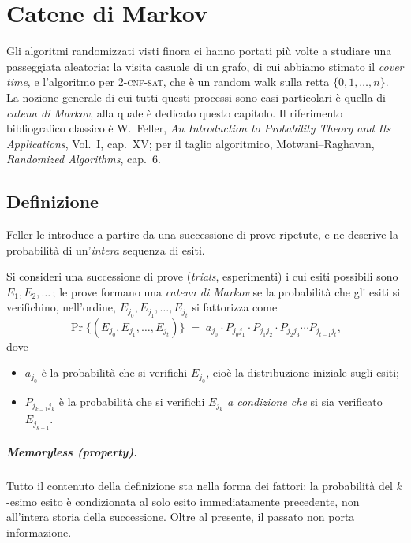\chapter{Catene di Markov}
\label{cap:catene-markov}

Gli algoritmi randomizzati visti finora ci hanno portati più volte a studiare una
passeggiata aleatoria: la visita casuale di un grafo, di cui abbiamo stimato il
\emph{cover time}, e l'algoritmo per \textsc{2-cnf-sat}, che è un random walk sulla
retta $\{0,1,\dots,n\}$. La nozione generale di cui tutti questi processi sono casi
particolari è quella di \emph{catena di Markov}, alla quale è dedicato questo
capitolo. Il riferimento bibliografico classico è W.~Feller, \emph{An Introduction to
Probability Theory and Its Applications}, Vol.~I, cap.~XV; per il taglio algoritmico,
Motwani--Raghavan, \emph{Randomized Algorithms}, cap.~6.


\section{Definizione}

Feller le introduce a partire da una successione di prove ripetute, e ne descrive la
probabilità di un'\emph{intera} sequenza di esiti.

\begin{definizione}\label{def:mc-feller}
  Si consideri una successione di prove (\emph{trials}, esperimenti) i cui esiti
  possibili sono $E_1, E_2, \dots$\,; le prove formano una \emph{catena di Markov} se la
  probabilità che gli esiti si verifichino, nell'ordine, $E_{j_0}, E_{j_1}, \dots,
  E_{j_t}$ si fattorizza come
  \[
    \Pr\bigl\{(E_{j_0}, E_{j_1}, \dots, E_{j_t})\bigr\}
      \;=\; a_{j_0} \cdot P_{j_0 j_1} \cdot P_{j_1 j_2} \cdot P_{j_2 j_3}
            \cdots P_{j_{t-1} j_t},
  \]
  dove
  \begin{itemize}
    \item $a_{j_0}$ è la probabilità che si verifichi $E_{j_0}$, cioè la distribuzione
          iniziale sugli esiti;
    \item $P_{j_{k-1} j_k}$ è la probabilità che si verifichi $E_{j_k}$ \emph{a
          condizione che} si sia verificato $E_{j_{k-1}}$.
  \end{itemize}
\end{definizione}

\paragraph{Memoryless (property).}
Tutto il contenuto della definizione sta nella forma dei fattori: la probabilità del
$k$-esimo esito è condizionata al solo esito immediatamente precedente, non all'intera
storia della successione. Oltre al presente, il passato non porta informazione.

